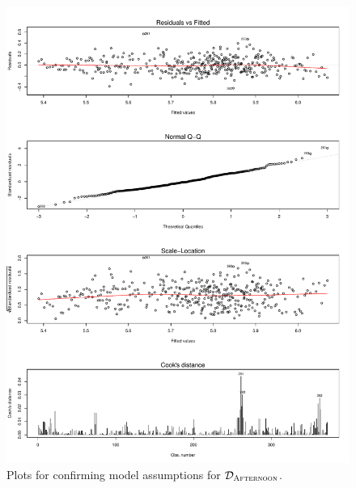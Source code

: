\begin{figure}[!ht]
    \center
    \includegraphics[width=\textwidth]{../plots/model_ap_assumptions}
    \caption{Plots for confirming model assumptions for $\mathcal{D}_{\textsc{Afternoon}}$.}    
    \label{fig:model_ap_assumptions}
\end{figure}